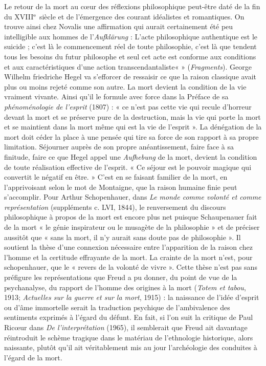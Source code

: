 Le retour de la mort au c{\oe}ur des réflexions philosophique peut-être daté de la fin du {\footnotesize XVIII}$^{\text e}$ siècle et de l'émergence des courant idéalistes et romantiques. On trouve ainsi chez Novalis une affirmation qui aurait certainement été peu intelligible aux hommes de l'{\it Aufklärung} : L'acte philosophique authentique est le suicide ; c'est là le commencement réel de toute philosophie, c'est là que tendent tous les besoins du futur philosophe et seul cet acte est conforme aux conditions et aux caractéristiques d'une action transcendantaliste« » ({\it Fragments}). George Wilhelm friedriche Hegel va s'efforcer de ressaisir ce que la raison classique avait plus ou moins rejeté comme son autre. La mort  devient la condition de la vie vraiment vivante. Ainsi qu'il le formule avec force dans la Préface de sa {\it phénoménologie de l'esprit} (1807) : « ce n'est pas cette vie qui recule d'horreur devant la mort et se préserve pure de la destruction, mais la vie qui porte la mort et se maintient dans la mort même qui est la vie de l'esprit ». La dénégation de la mort doit céder la place à une pensée qui tire sa force de son rapport à sa propre limitation. Séjourner auprès de son propre anéantissement, faire face à sa finitude, faire ce que Hegel appel une {\it Aufhebung} de la mort, devient la condition de toute réalisation effective de l'esprit. « Ce séjour est le pouvoir magique qui convertit le négatif en être. » C'est en se faisant familier de la mort, en l'apprivoisant selon le mot de Montaigne, que la raison humaine finie peut s'accomplir. Pour Arthur Schopenhauer, dans {\it Le monde comme volonté et comme représentation} (suppléments c. LVI, 1844), le renversement du discours philosophique à propos de la mort est encore plus net puisque Schaupenauer fait de la mort « le génie inspirateur ou le musagète de la philosophie » et de préciser aussitôt que « sans la mort, il n'y aurait sans doute pas de philosophie ». Il soutient la thèse d'une connexion nécessaire entre l'apparition de la raison chez l'homme et la certitude effrayante de la mort. La crainte de la mort n'est, pour schopenhauer, que le « revers de la volonté de vivre ». Cette thèse n'est pas sans préfigure les représentations que Freud a pu donner, du point de vue de la psychanalyse, du rapport de l'homme des origines à la mort ({\it Totem et tabou}, 1913; {\it Actuelles sur la guerre et sur la mort}, 1915) : la naissance de l'idée d'esprit ou d'âme immortelle serait la traduction psychique de l'ambivalence des sentiments exprimés à l'égard du défunt. En fait, si l'on suit la critique de Paul Ric{\oe}ur dans {\it De l'interprétation} (1965), il semblerait que Freud ait davantage réintroduit le schème tragique dans le matériau de l'ethnologie historique, alors naissante, plutôt qu'il ait véritablement mis au jour l'archéologie des conduites à l'égard de la mort. 

